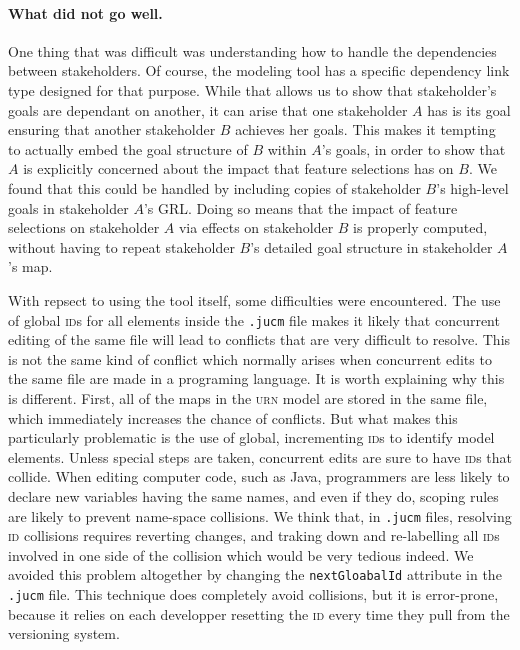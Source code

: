 \documentclass[10pt,fleqn]{article}
\begin{document}
\paragraph{What did not go well.}
	One thing that was difficult was understanding how to handle the 
	dependencies between stakeholders.  Of course, the modeling tool has a 
	specific dependency link type designed for that purpose.  While that allows
	us to show that stakeholder's goals are dependant on another, it can 
	arise that one stakeholder $A$ has is its goal ensuring that another 
	stakeholder $B$ achieves her goals.  This makes it tempting to actually
	embed the goal structure of $B$ within $A$'s goals, in order to show that
	$A$ is explicitly concerned about the impact that feature selections has 
	on $B$.  We found that this could be handled by including copies of 
	stakeholder $B$'s high-level goals in stakeholder $A$'s GRL.  Doing so
	means that the impact of feature selections on stakeholder $A$ via effects
	on stakeholder $B$ is properly computed, without having to repeat
	stakeholder $B$'s detailed goal structure in stakeholder $A$'s map.

	With repsect to using the tool itself, some difficulties were encountered.
	The use of global \textsc{id}s for all elements inside the \texttt{.jucm} 
	file makes it 
	likely that concurrent editing of the same file will lead to conflicts
	that are very difficult to resolve.  This is not the same kind of conflict
	which normally arises when concurrent edits to the same file are made in
	a programing language.  It is worth explaining why this is different.  
	First, all of the maps in the \textsc{urn} model are stored in the same 
	file, which
	immediately increases the chance of conflicts.  But what makes this
	particularly problematic is the use of global, incrementing \textsc{id}s 
	to identify model elements.  Unless special steps are taken, 
	concurrent edits are sure to have \textsc{id}s that collide.  When
	editing computer code, such as Java,  programmers are 
	less likely to declare new variables having the same names, and even if
	they do, scoping rules are likely to prevent name-space collisions.  
	We think that, in \texttt{.jucm} files, resolving \textsc{id} collisions 
	requires 
	reverting changes, and traking down and re-labelling all \textsc{id}s 
	involved in 
	one side of the collision which would be very tedious indeed.  We avoided 
	this problem altogether by changing the 
	\texttt{nextGloabalId} attribute in the \texttt{.jucm} file.  This 
	technique does completely avoid collisions, but it is error-prone, 
	because it relies on each developper resetting the \textsc{id} every time they pull
	from the versioning system.

	
\end{document}
